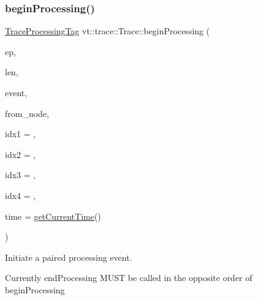 \subsubsection{\texorpdfstring{begin\+Processing()}{beginProcessing()}}
{\footnotesize\ttfamily \hyperlink{structvt_1_1trace_1_1_trace_processing_tag}{Trace\+Processing\+Tag} vt\+::trace\+::\+Trace\+::begin\+Processing (\begin{DoxyParamCaption}\item[{\hyperlink{namespacevt_1_1trace_a3c14050715ba9eceaeff51fb3de64f2f}{Trace\+Entry\+I\+D\+Type} const}]{ep,  }\item[{\hyperlink{namespacevt_1_1trace_aeb598f45d67d41db7902e494f2f0ce59}{Trace\+Msg\+Len\+Type} const}]{len,  }\item[{\hyperlink{namespacevt_1_1trace_a64a7185f3e102df8d8258f263ccd1582}{Trace\+Event\+I\+D\+Type} const}]{event,  }\item[{\hyperlink{namespacevt_a866da9d0efc19c0a1ce79e9e492f47e2}{Node\+Type} const}]{from\+\_\+node,  }\item[{uint64\+\_\+t const}]{idx1 = {},  }\item[{uint64\+\_\+t const}]{idx2 = {},  }\item[{uint64\+\_\+t const}]{idx3 = {},  }\item[{uint64\+\_\+t const}]{idx4 = {},  }\item[{double const}]{time = {\ttfamily \hyperlink{structvt_1_1trace_1_1_trace_lite_ad1d8159d645a3b7047ce3f2e0c080f8d}{get\+Current\+Time}()} }\end{DoxyParamCaption})}



Initiate a paired processing event. 

Currently {\ttfamily end\+Processing} M\+U\+ST be called in the opposite order of {\ttfamily begin\+Processing} 


